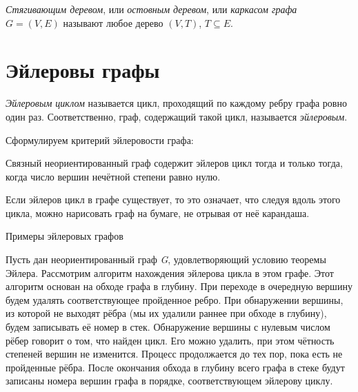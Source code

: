 \emph{Стягивающим деревом}, или \emph{остовным деревом}, или \emph{каркасом 
графа} $G=(V,E)$ называют любое дерево $(V,T)$, $T \subseteq E$.

\section{Эйлеровы графы}

\emph{Эйлеровым циклом} называется цикл, проходящий по каждому ребру графа 
ровно один раз. Соответственно, граф, содержащий такой цикл, называется 
\emph{эйлеровым}.

Сформулируем критерий эйлеровости графа:

\begin{theorem}[Эйлер, 1736г.]
Связный неориентированный граф содержит эйлеров цикл тогда и только тогда, 	
когда число вершин нечётной степени равно нулю.
\end{theorem}

Если эйлеров цикл в графе существует, то это означает, что следуя вдоль этого 
цикла, можно нарисовать граф на бумаге, не отрывая от неё карандаша.

\begin{floatingfigure}{10cm}
	\center
	\caption{Примеры эйлеровых графов}
	\label{Examples of Eulerian graphs}
\end{floatingfigure}

Пусть дан неориентированный граф \emph{G}, удовлетворяющий условию теоремы 
Эйлера. Рассмотрим алгоритм нахождения эйлерова цикла в этом графе. Этот 
алгоритм основан на обходе графа в глубину. При переходе в очередную вершину 
будем удалять соответствующее пройденное ребро. При обнаружении вершины, из 
которой не выходят рёбра (мы их удалили раннее при обходе в глубину), будем 
записывать её номер в стек. Обнаружение вершины с нулевым числом рёбер говорит 
о том, что найден цикл. Его можно удалить, при этом чётность степеней вершин не 
изменится. Процесс продолжается до тех пор, пока есть не пройденные рёбра. 
После окончания обхода в глубину всего графа в стеке будут записаны номера 
вершин графа в порядке, соответствующем эйлерову циклу.

